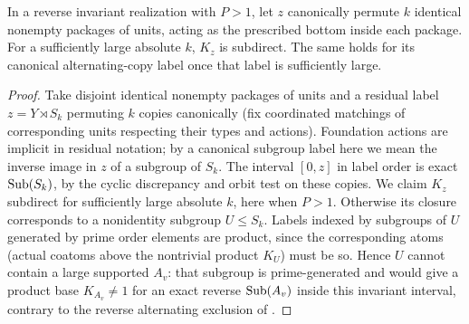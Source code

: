 \begin{lemma}\label{t:weighted-copy-action}
In a reverse invariant realization with \(P>1\), let \(z\) canonically
permute \(k\) identical nonempty packages of units, acting as the prescribed
bottom inside each package.  For a sufficiently large absolute \(k\),
\(K_z\) is subdirect.  The same holds for its canonical alternating-copy
label once that label is sufficiently large.
\end{lemma}
\begin{proof}
Take disjoint identical nonempty packages of units and a residual label \(z=Y\rtimes S_k\)
permuting \(k\) copies canonically (fix coordinated matchings of corresponding units respecting
their types and actions). Foundation actions are implicit in residual notation; by a canonical
subgroup label here we mean the inverse image in \(z\) of a subgroup of \(S_k\). The interval
\([0,z]\) in label order is exact \({\rm Sub}(S_k)\), by the cyclic discrepancy and orbit test on
these copies. We claim \(K_z\) subdirect for sufficiently large absolute \(k\), here when \(P>1\).
Otherwise its closure corresponds to a nonidentity subgroup \(U\le S_k\). Labels indexed by
subgroups of \(U\) generated by prime order elements are product, since the corresponding atoms
(actual coatoms above the nontrivial product \(K_U\)) must be so. Hence \(U\) cannot contain a
large supported \(A_v\): that subgroup is prime-generated and would give a product base
\(K_{A_v}\ne1\) for an exact reverse \({\rm Sub}(A_v)\) inside this invariant interval, contrary
to the reverse alternating exclusion of .


\end{proof}
